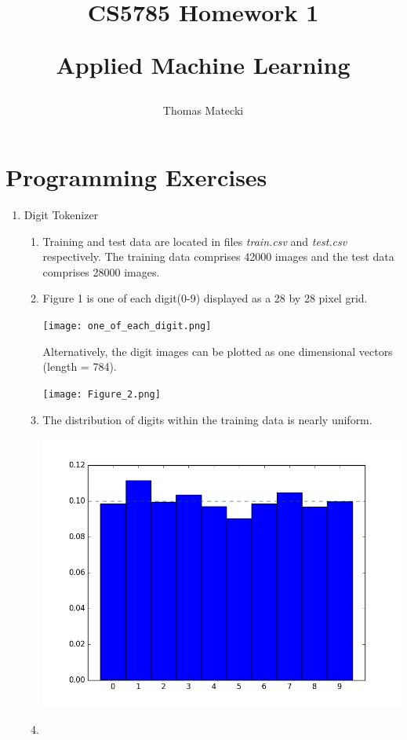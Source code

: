 \documentclass{report}
\begin{document}
\title{
CS5785 Homework 1\\
	\begin{large}
		Applied Machine Learning
	\end{large}
}
\author{Thomas Matecki}
\maketitle
\section*{Programming Exercises}

\begin{enumerate}
	\item Digit Tokenizer
	\begin{enumerate}[label=(\alph*)]
		\item 
		Training and test data are located in files \textit{train.csv} and \textit{test.csv} respectively. The training data comprises 42000 images and the test data comprises 28000 images.

		\item Figure 1 is one of each digit(0-9) displayed as a 28 by 28 pixel grid.  
		\begin{center}
		\texttt{[image: one\_of\_each\_digit.png]}
		\end{center}
		Alternatively, the digit images can be plotted as one dimensional vectors (length = 784).
		\begin{center}
		\texttt{[image: Figure\_2.png]}
		\end{center}
		\newpage
		\item The distribution of digits within the training data is nearly uniform.
		\begin{center}
		\includegraphics{distrib.png}
		\end{center}	
		\item
	\end{enumerate}
	

\end{enumerate}
\end{document}
